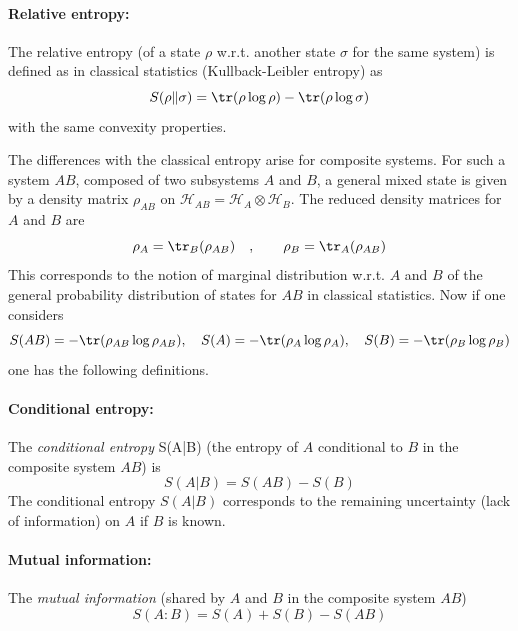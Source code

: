 \paragraph{Relative entropy:} 
The relative entropy (of a state $\rho$ w.r.t. another state $\sigma$ for the same system) is defined as in classical statistics (Kullback-Leibler entropy) as 
\begin{equation}
\label{ }
S(\rho\|\sigma)=\tr(\rho\log\rho)-\tr(\rho\log\sigma)
\end{equation}
with the same convexity properties.

The differences with the classical entropy arise for composite systems. For such a system $AB$, composed of two subsystems $A$ and $B$, a general mixed state is given by a density matrix $\rho_{AB}$ on $\mathcal{H}_{AB}=\mathcal{H}_{A}\otimes\mathcal{H}_{B}$.
The reduced density matrices for $A$ and $B$ are 
\begin{equation}
\label{ }
\rho_A=\tr_B(\rho_{AB})
\quad,\qquad
\rho_B=\tr_A(\rho_{AB})
\end{equation}
This corresponds to the notion of marginal distribution w.r.t. $A$ and $B$ of the general probability distribution of states for $AB$ in classical statistics.
Now if one considers
\begin{equation}
\label{ }
S({AB})=-\tr(\rho_{AB}\log\rho_{AB}),\quad
S({A})=-\tr(\rho_{A}\log\rho_{A}),\quad
S({B})=-\tr(\rho_{B}\log\rho_{B})
\end{equation}
one has the following definitions.
\paragraph{Conditional entropy:} 
The \emph{conditional entropy} S(A|B) (the entropy of $A$ conditional to $B$ in the composite system $AB$) is
\begin{equation}
\label{ }
S(A|B)=S(AB) - S(B)
\end{equation}
The conditional entropy $S(A|B)$ corresponds to the remaining uncertainty (lack of information) on $A$ if $B$ is known.
\paragraph{Mutual information:} 
The \emph{mutual information} (shared by $A$ and $B$ in the composite system $AB$)
\begin{equation}
\label{MutInf}
S(A:B)=S(A)+S(B)-S(AB)
\end{equation}
